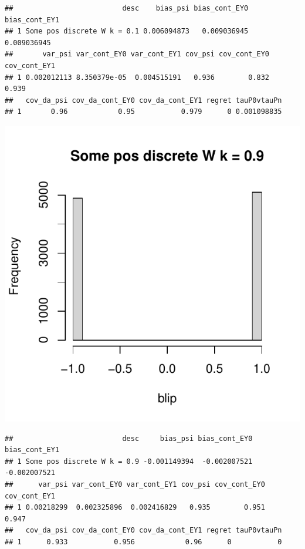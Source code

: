 \documentclass[11pt]{article}\usepackage[]{graphicx}\usepackage[table]{xcolor}
\makeatletter
\def\maxwidth{ %
  \ifdim\Gin@nat@width>\linewidth
    \linewidth
  \else
    \Gin@nat@width
  \fi
}
\newenvironment{kframe}{%
 \def\at@end@of@kframe{}%
 \ifinner\ifhmode%
  \def\at@end@of@kframe{\end{minipage}}%
  \begin{minipage}{\columnwidth}%
 \fi\fi%
 \def\FrameCommand##1{\hskip\@totalleftmargin \hskip-\fboxsep
 \colorbox{shadecolor}{##1}\hskip-\fboxsep
     \hskip-\linewidth \hskip-\@totalleftmargin \hskip\columnwidth}%
 \MakeFramed {\advance\hsize-\width
   \@totalleftmargin\z@ \linewidth\hsize
   \@setminipage}}%
 {\par\unskip\endMakeFramed%
 \at@end@of@kframe}
\newenvironment{knitrout}{}{} %
\makeatother
\begin{document}
\begin{knitrout}
\begin{kframe}\begin{verbatim}
##                          desc    bias_psi bias_cont_EY0 bias_cont_EY1
## 1 Some pos discrete W k = 0.1 0.006094873   0.009036945   0.009036945
##       var_psi var_cont_EY0 var_cont_EY1 cov_psi cov_cont_EY0 cov_cont_EY1
## 1 0.002012113 8.350379e-05  0.004515191   0.936        0.832        0.939
##   cov_da_psi cov_da_cont_EY0 cov_da_cont_EY1 regret tauP0vtauPn
## 1       0.96            0.95           0.979      0 0.001098835
\end{verbatim}
\end{kframe}
\includegraphics[width=\maxwidth]{figure/unnamed-chunk-4-4} 
\begin{kframe}\begin{verbatim}
##                          desc     bias_psi bias_cont_EY0 bias_cont_EY1
## 1 Some pos discrete W k = 0.9 -0.001149394  -0.002007521  -0.002007521
##      var_psi var_cont_EY0 var_cont_EY1 cov_psi cov_cont_EY0 cov_cont_EY1
## 1 0.00218299  0.002325896  0.002416829   0.935        0.951        0.947
##   cov_da_psi cov_da_cont_EY0 cov_da_cont_EY1 regret tauP0vtauPn
## 1      0.933           0.956            0.96      0           0
\end{verbatim}
\end{kframe}

\end{knitrout}
\end{document}
